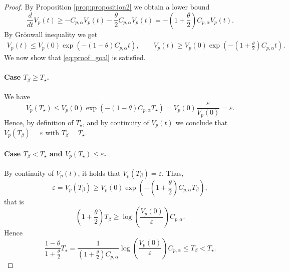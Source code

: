 \documentclass[11pt,handout]{article}%
\numberwithin{equation}{section}
\theoremstyle{definition}
\begin{document}
\begin{proof}
	By Proposition \ref{prop:proposition2} we obtain a lower bound
	\begin{equation*}
		\frac{d}{dt} V_p(t)\geq -C_{p,\alpha} V_p(t) -\frac{\theta}{2}C_{p,\alpha} V_p(t) = -\left(1+\frac{\theta}{2}\right) C_{p,\alpha} V_p(t).
	\end{equation*}
	By Gr{\"o}nwall inequality we get 
	\begin{equation*}
		\begin{split}
			V_p(t) \leq  V_p(0) \exp\left(  -(1-\theta)C_{p,\alpha}t\right),\qquad
			V_p(t) \geq  V_p(0) \exp\left(  -\left(1+\frac{\theta}{2}\right)C_{p,\alpha}t\right).
		\end{split}
	\end{equation*}
	We now show that \eqref{eq:proof_goal} is satisfied. 
	\paragraph{Case $T_\beta \geq T_\star$.} 
	We have 
	\begin{equation*}
		V_p(T_\star) \leq V_p(0) \exp(-(1-\theta)C_{p,\alpha} T_\star) = V_p(0) \frac{\varepsilon}{V_p(0)} = \varepsilon.
	\end{equation*}
	Hence, by definition of $T_\star$, and by continuity of $V_p(t)$ we conclude that $V_p(T_\beta) =\varepsilon$ with $T_\beta = T_\star$. 
	\paragraph{Case $T_\beta <T_\star$ and $V_p(T_\star) \leq  \varepsilon$.} By continuity of $V_p(t)$, it holds that $V_p(T_\beta)=\varepsilon$. Thus,
	\begin{equation*}
		\varepsilon = V_p(T_\beta) \geq V_p(0) \exp\left(  -\left(1+\frac{\theta}{2}\right) C_{p,\alpha} T_\beta \right),
	\end{equation*}
	that is 
	\begin{equation*}
		\left( 1+\frac{\theta}{2} \right) T_\beta \geq \log\left( \frac{V_p(0)}{\varepsilon}\right)C_{p,\alpha}. 
	\end{equation*}
	Hence
	\begin{equation*}
		\frac{1-\theta}{1+\frac{\theta}{2}} T_\star= 	\frac{1}{(1+\frac{\theta}{2})C_{p,\alpha}} \log\left( \frac{V_p(0)}{\varepsilon}\right)C_{p,\alpha}\leq T_\beta < T_\star. 
	\end{equation*}

\end{proof}
\end{document}
